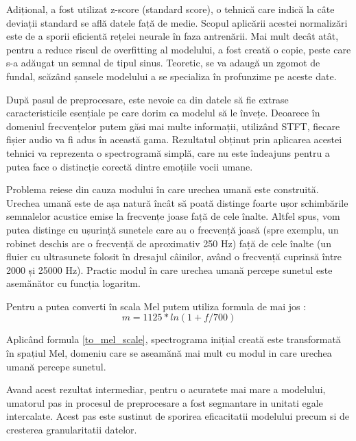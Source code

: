 \documentclass[a4paper, 12pt]{report}
\begin{document}
	Adițional, a fost utilizat z-score (standard score), o tehnică care indică la câte deviații standard se află datele față de medie. Scopul aplicării acestei normalizări este de a sporii eficientă rețelei neurale în faza antrenării. Mai mult decât atât, pentru a reduce riscul de overfitting al modelului, a fost creată o copie, peste care s-a adăugat un semnal de tipul sinus. Teoretic, se va adaugă un zgomot de fundal, scăzând șansele modelului a se specializa în profunzime pe aceste date.
	
	După pasul de preprocesare, este nevoie ca din datele să fie extrase caracteristicile esențiale pe care dorim ca modelul să le învețe. Deoarece în domeniul frecvențelor putem găsi mai multe informații, utilizând STFT, fiecare fișier audio va fi adus în această gama. Rezultatul obținut prin aplicarea acestei tehnici va reprezenta o spectrogramă simplă, care nu este îndeajuns pentru a putea face o distincție corectă dintre emoțiile vocii umane. 
	
	Problema reiese din cauza modului în care urechea umană este construită. Urechea umană este de așa natură încât să poată distinge foarte ușor schimbările semnalelor acustice emise la frecvențe joase față de cele înalte. Altfel spus, vom putea distinge cu ușurință sunetele care au o frecvență joasă (spre exemplu, un robinet deschis are o frecvență de aproximativ 250 Hz) față de cele înalte (un fluier cu ultrasunete folosit în dresajul câinilor, având o frecvență cuprinsă între 2000 și 25000 Hz). Practic modul în care urechea umană percepe sunetul este asemănător cu funcția logaritm.
	
	Pentru a putea converti în scala Mel putem utiliza formula de mai jos :
	\begin{equation}
	\label{to_mel_scale}
		m=1125 * ln(1+f/700)
	\end{equation}
	
	Aplicând formula \ref{to_mel_scale}, spectrograma inițial creată este transformată în spațiul Mel, domeniu care se aseamănă mai mult cu modul in care urechea umană percepe sunetul.
	
	Avand acest rezultat intermediar, pentru o acuratete mai mare a modelului, umatorul pas in procesul de preprocesare a fost segmantare in unitati egale intercalate. Acest pas este sustinut de sporirea eficacitatii modelului precum si de cresterea granularitatii datelor.
	
\end{document}
